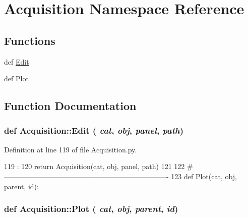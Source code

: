 \hypertarget{namespaceAcquisition}{
\section{Acquisition Namespace Reference}
\label{namespaceAcquisition}
}
\subsection*{Functions}
\begin{DoxyCompactItemize}
\item 
def \hyperlink{namespaceAcquisition_a301faa6c22f2040780a48b501e4c6869}{Edit}
\item 
def \hyperlink{namespaceAcquisition_af35d4f9df19b1fe5aadcc3076e43c59b}{Plot}
\end{DoxyCompactItemize}


\subsection{Function Documentation}
\hypertarget{namespaceAcquisition_a301faa6c22f2040780a48b501e4c6869}{
\subsubsection[{Edit}]{\setlength{\rightskip}{0pt plus 5cm}def Acquisition::Edit ( {\em cat}, \/   {\em obj}, \/   {\em panel}, \/   {\em path})}}
\label{namespaceAcquisition_a301faa6c22f2040780a48b501e4c6869}


Definition at line 119 of file Acquisition.py.


\begin{DoxyCode}
119                                 :
120     return Acquisition(cat, obj, panel, path)
121 
122 #----------------------------------------------------------------------
123 
def Plot(cat, obj, parent, id):
\end{DoxyCode}
\hypertarget{namespaceAcquisition_af35d4f9df19b1fe5aadcc3076e43c59b}{
\subsubsection[{Plot}]{\setlength{\rightskip}{0pt plus 5cm}def Acquisition::Plot ( {\em cat}, \/   {\em obj}, \/   {\em parent}, \/   {\em id})}}
\label{namespaceAcquisition_af35d4f9df19b1fe5aadcc3076e43c59b}


